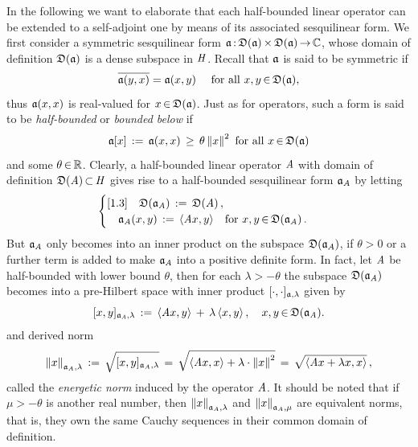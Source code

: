 \documentclass[11pt,twoside]{article}
\begin{document}
\subsubsection*{}
In the following we want to elaborate
that each half-bounded linear operator can be extended to a self-adjoint one
by means of its associated sesquilinear form.
We first consider a symmetric sesquilinear form
$\mathfrak{a} {\,:\,} \mathfrak{D}(\mathfrak{a}) {\,\times\,} \mathfrak{D}(\mathfrak{a}) {\,\to\,} {\mathbb{C}}$,
whose domain of definition $\mathfrak{D}(\mathfrak{a})$ is a dense subspace in $\mathit{H}$.
Recall that $\mathfrak{a}$ is said to be symmetric if
\[
\overline{\mathfrak{a}(y,x)} = \mathfrak{a}(x,y) \quad \mbox{ for all } x,y {\,\in\,} \mathfrak{D}(\mathfrak{a}),
\]
thus $\mathfrak{a}(x,x)$ is real-valued for $x {\,\in\,} \mathfrak{D}(\mathfrak{a})$.
Just as for operators,
such a form is said to be \textit{half-bounded} or \textit{bounded below}
if
\[
\mathfrak{a} [x] \,:=\, \mathfrak{a}(x,x) \, \geq \, \theta \left\lVert x \right\rVert^2
\mbox{ for all } x {\,\in\,} \mathfrak{D}(\mathfrak{a})
\]
and some $\theta {\,\in\,} {\mathbb{R}}$.
Clearly,
a half-bounded linear operator $\mathit{A}$ with domain of definition 
$\mathfrak{D}(\mathit{A}) {\,\subset\,} \mathit{H}$ gives rise to a half-bounded sesquilinear form
$\mathfrak{a}_{\mathit{A}}$ by letting
\[
\begin{cases}[1.3]
\quad \mathfrak{D}(\mathfrak{a}_{\mathit{A}}) \,:=\, \mathfrak{D}(\mathit{A})\,,\\
\quad \mathfrak{a}_{\mathit{A}}(x,y)     \,:=\, \langle \mathit{A} x,y \rangle
\quad \mbox{for } x,y {\,\in\,} \mathfrak{D}(\mathfrak{a}_{\mathit{A}})\,.\\
\end{cases}
\]
But $\mathfrak{a}_{\mathit{A}}$ only becomes into an inner product
on the subspace $\mathfrak{D}(\mathfrak{a}_A)$,
if $\theta > 0$ or a further term is added
to make $\mathfrak{a}_{\mathit{A}}$ into a positive definite form.
In fact,
let $\mathit{A}$ be half-bounded with lower bound $\theta$,
then for each $\lambda > -\theta$
the subspace $\mathfrak{D}(\mathfrak{a}_{\mathit{A}})$ becomes into a pre-Hilbert space
with inner product $[\cdot,\cdot]_{\mathfrak{a},\lambda}$ given by
\[
[x,y]_{\mathfrak{a}_{\mathit{A}},\lambda} \,:=\,
\langle \mathit{A} x,y \rangle \, + \, \lambda \, \langle x,y \rangle\,,
\quad x,y {\,\in\,} \mathfrak{D}(\mathfrak{a}_{\mathit{A}}).
\]
and derived norm
\begin{equation}\label{ENERGETIC_NORM}
\left\lVert x \right\rVert_{\mathfrak{a}_A,\lambda} \,:=\,
\sqrt{[x,y]_{\mathfrak{a}_A,\lambda}} \,=\,
\sqrt{\langle \mathit{A} x,x \rangle + \lambda \cdot \left\lVert x \right\rVert^2}
\,=\,
\sqrt{\langle \mathit{A} x + \lambda x,x \rangle}\,,
\end{equation}
called the \textit{energetic norm} induced by the operator $\mathit{A}$.
It should be noted
that if $\mu > -\theta$ is another real number,
then $\left\lVert x \right\rVert_{\mathfrak{a}_A,\lambda}$ and $\left\lVert x \right\rVert_{\mathfrak{a}_A,\mu}$
are equivalent norms,
that is,
they own the same Cauchy sequences in their common domain of definition.
\end{document}
